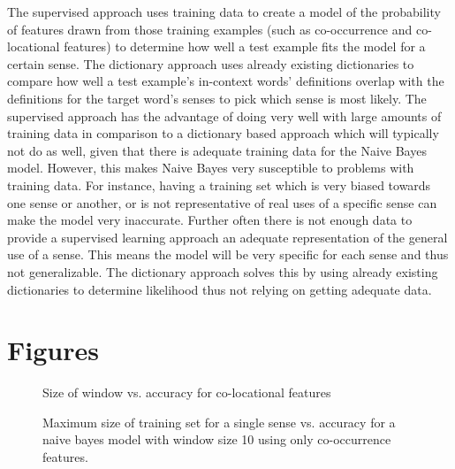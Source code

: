 \documentclass{article}
\begin{document}
The supervised approach uses training data to create a model of the probability of features drawn from those training examples (such as co-occurrence and co-locational features) to determine how well a test example fits the model for a certain sense. The dictionary approach uses already existing dictionaries to compare how well a test example's in-context words' definitions overlap with the definitions for the target word's senses to pick which sense is most likely. The supervised approach has the advantage of doing very well with large amounts of training data in comparison to a dictionary based approach which will typically not do as well, given that there is adequate training data for the Naive Bayes model. However, this makes Naive Bayes very susceptible to problems with training data. For instance, having a training set which is very biased towards one sense or another, or is not representative of real uses of a specific sense can make the model very inaccurate. Further often there is not enough data to provide a supervised learning approach an adequate representation of the general use of a sense. This means the model will be very specific for each sense and thus not generalizable. The dictionary approach solves this by using already existing dictionaries to determine likelihood thus not relying on getting adequate data.
\newpage
\section{Figures}

{\small
\begin{figure}[h]\label{fig:col}
\centering
{}
\caption{Size of window vs. accuracy for co-locational features}
\end{figure}}

{\small \begin{figure}[h]\label{fig:size}
\centering
{}
\caption{Maximum size of training set for a single sense vs. accuracy for a naive bayes model with window size 10 using only co-occurrence features.}
\end{figure}
}
\end{document}
